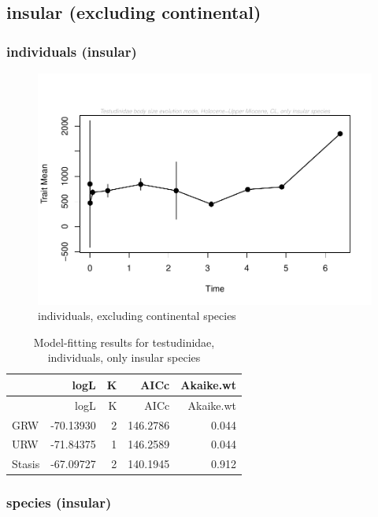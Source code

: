 \documentclass[]{article}
\begin{document}
\newpage

\subsection{insular (excluding
continental)}\label{insular-excluding-continental}

\subsubsection{individuals (insular)}\label{individuals-insular}

\begin{figure}[htbp]
\centering
\includegraphics{MA_JJ_files/figure-latex/paleoTS, individuals, exluding continental species-1.pdf}
\caption{individuals, excluding continental species}
\end{figure}

\begin{longtable}[]{@{}lrrrr@{}}
\caption{Model-fitting results for testudinidae, individuals, only
insular species}\tabularnewline
\toprule
& logL & K & AICc & Akaike.wt\tabularnewline
\midrule
\endfirsthead
\toprule
& logL & K & AICc & Akaike.wt\tabularnewline
\midrule
\endhead
GRW & -70.13930 & 2 & 146.2786 & 0.044\tabularnewline
URW & -71.84375 & 1 & 146.2589 & 0.044\tabularnewline
Stasis & -67.09727 & 2 & 140.1945 & 0.912\tabularnewline
\bottomrule
\end{longtable}

\newpage

\subsubsection{species (insular)}\label{species-insular}
\end{document}
